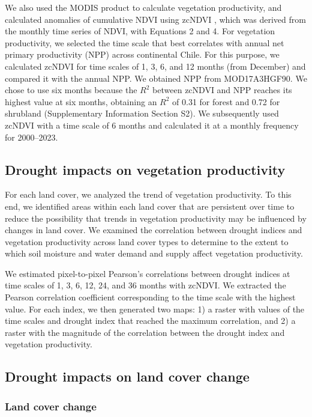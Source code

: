 \documentclass[
  sn-nature,
  numbered]{sn-jnl}
\begin{document}
We also used the MODIS product to calculate vegetation productivity, and
calculated anomalies of cumulative NDVI using zcNDVI
\citep{Zambrano2018}, which was derived from the monthly time series of
NDVI, with Equations 2 and 4. For vegetation productivity, we selected
the time scale that best correlates with annual net primary productivity
(NPP) across continental Chile. For this purpose, we calculated zcNDVI
for time scales of 1, 3, 6, and 12 months (from December) and compared
it with the annual NPP. We obtained NPP from MOD17A3HGF90. We chose to
use six months because the \(R^2\) between zcNDVI and NPP reaches its
highest value at six months, obtaining an \(R^2\) of 0.31 for forest and
0.72 for shrubland (Supplementary Information Section S2). We
subsequently used zcNDVI with a time scale of 6 months and calculated it
at a monthly frequency for 2000--2023.

\subsection{Drought impacts on vegetation
productivity}\label{drought-impacts-on-vegetation-productivity}

For each land cover, we analyzed the trend of vegetation productivity.
To this end, we identified areas within each land cover that are
persistent over time to reduce the possibility that trends in vegetation
productivity may be influenced by changes in land cover. We examined the
correlation between drought indices and vegetation productivity across
land cover types to determine to the extent to which soil moisture and
water demand and supply affect vegetation productivity.

We estimated pixel-to-pixel Pearson's correlations between drought
indices at time scales of 1, 3, 6, 12, 24, and 36 months with zcNDVI. We
extracted the Pearson correlation coefficient corresponding to the time
scale with the highest value. For each index, we then generated two
maps: 1) a raster with values of the time scales and drought index that
reached the maximum correlation, and 2) a raster with the magnitude of
the correlation between the drought index and vegetation productivity.

\subsection{Drought impacts on land cover
change}\label{drought-impacts-on-land-cover-change}

\subsubsection{Land cover change}\label{land-cover-change}
\end{document}
